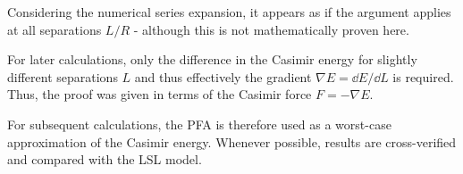 \begin{remark}
  Considering the numerical series expansion, it appears as if the argument applies at all separations $L/R$ - although this is not mathematically proven here.
\end{remark}
For later calculations, only the difference in the Casimir energy for slightly different separations $L$ and thus effectively the gradient $\nabla E = \dd E / \dd L$ is required. Thus, the proof was given in terms of the Casimir force $F= -\nabla E$.

For subsequent calculations, the PFA is therefore used as a worst-case approximation of the Casimir energy. Whenever possible, results are cross-verified and compared with the LSL model.